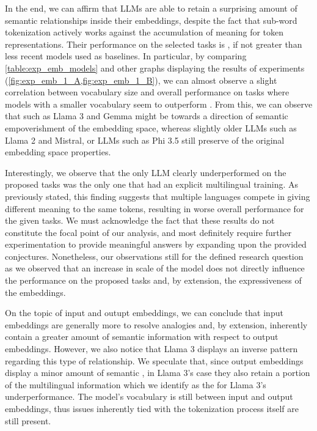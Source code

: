 In the end, we can affirm that LLMs are able to retain a surprising amount of semantic relationships inside their embeddings, despite the fact that sub-word tokenization actively works against the accumulation of meaning for token representations.
Their performance on the selected tasks is , if not greater than less recent models used as baselines.
In particular, by comparing \cref{table:exp_emb_models} and other graphs displaying the results of experiments (\cref{fig:exp_emb_1_A,fig:exp_emb_1_B}), we can almost observe a slight correlation between vocabulary size and overall performance on tasks where models with a smaller vocabulary seem to outperform .
From this, we can observe that  such as Llama 3 and Gemma might be  towards a direction of semantic empoverishment of the embedding space, whereas slightly older LLMs such as Llama 2 and Mistral, or LLMs  such as Phi 3.5 still preserve  of the original embedding space properties.

Interestingly, we observe that the only LLM  clearly underperformed on the proposed tasks was the only one that had an explicit multilingual training.
As previously stated, this finding suggests that multiple languages compete in giving different meaning to the same tokens, resulting in worse overall performance for the given tasks.
We must acknowledge the fact that these results do not constitute the focal point of our analysis, and most definitely require further experimentation to provide meaningful answers by expanding upon the provided conjectures.
Nonetheless, our observations still  for the defined research question as we observed that an increase in scale of the model does not directly influence the performance on the proposed tasks and, by extension, the expressiveness of the embeddings.

On the topic of input and outupt embeddings, we can conclude that input embeddings are generally more  to resolve analogies and, by extension, inherently contain a greater amount of semantic information with respect to output embeddings.
However, we also notice that Llama 3 displays an inverse pattern regarding this type of relationship.
We speculate that, since output embeddings display a minor amount of semantic , in Llama 3's case they also retain a  portion of the multilingual information which we identify as the  for Llama 3's underperformance.
The model's vocabulary is still  between input and output embeddings, thus issues inherently tied with the tokenization process itself are still present.


